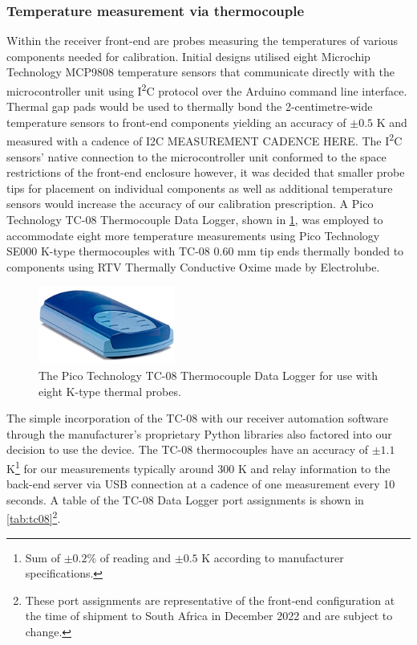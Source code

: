 \subsubsection{Temperature measurement via thermocouple}
Within the receiver front-end are probes measuring the temperatures of various components needed for calibration. Initial designs utilised eight Microchip Technology MCP9808 temperature sensors that communicate directly with the microcontroller unit using I\textsuperscript{2}C protocol over the Arduino command line interface. Thermal gap pads would be used to thermally bond the 2-centimetre-wide temperature sensors to front-end components yielding an accuracy of $\pm 0.5$ K and measured with a cadence of I2C MEASUREMENT CADENCE HERE. The I\textsuperscript{2}C sensors’ native connection to the microcontroller unit conformed to the space restrictions of the front-end enclosure however, it was decided that smaller probe tips for placement on individual components as well as additional temperature sensors would increase the accuracy of our calibration prescription. A Pico Technology TC-08 Thermocouple Data Logger, shown in \cref{fig:tc08}, was employed to accommodate eight more temperature measurements using Pico Technology SE000 K-type thermocouples with TC-08 0.60 mm tip ends thermally bonded to components using RTV Thermally Conductive Oxime made by Electrolube.
\begin{figure}
    \centering
    \includegraphics[width=0.4\textwidth]{tc08}
    \caption{The Pico Technology TC-08 Thermocouple Data Logger for use with eight K-type thermal probes.}
    \label{fig:tc08}
\end{figure}
The simple incorporation of the TC-08 with our receiver automation software through the manufacturer’s proprietary Python libraries also factored into our decision to use the device. The TC-08 thermocouples have an accuracy of $\pm 1.1$ K\footnote{Sum of $\pm0.2$\% of reading and $\pm0.5$ K according to manufacturer specifications.} for our measurements typically around 300 K and relay information to the back-end server via USB connection at a cadence of one measurement every 10 seconds. A table of the TC-08 Data Logger port assignments is shown in \cref{tab:tc08}\footnote{These port assignments are representative of the front-end configuration at the time of shipment to South Africa in December 2022 and are subject to change.}.
